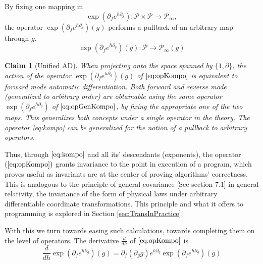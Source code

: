 \documentclass[smallcondensed]{svjour3}
\newcommand{\dP}{\mathcal{P}}
\newcommand{\D}{\partial}
\newtheorem{trditev}{Claim}[section]
\begin{document}
 By fixing one mapping in  
 \begin{equation}\label{eq:opGenKompo}
\exp(\D_fe^{h\D_g}): \dP\times\dP\to\dP_\infty,
 \end{equation}
 the operator $\exp(\D_fe^{h\D_g})(g)$ performs a pullback of an arbitrary map through $g$. 
  \begin{equation}\label{eq:opKompo}
  \exp(\D_fe^{h\D_g})(g): \dP\to\dP_\infty(g)
  \end{equation}
 \begin{trditev}[Unified AD]\label{trd:reverseForward}
 When projecting onto the space spanned by $\{1,\D\}$, the action of the operator $\exp(\D_fe^{h\D_g})(g)$ of $\eqref{eq:opKompo}$ is equivalent to forward \cite{PcAD} mode automatic differentiation. Both forward \cite{PcAD} and reverse \cite{ReverseAD} mode (generalized to arbitrary order) are obtainable using the same operator $\exp(\D_fe^{h\D_g})$ of $\eqref{eq:opGenKompo}$, by fixing the appropriate one of the two maps. This generalizes both concepts under a single operator in the theory. The operator \eqref{eq:kompo} can be generalized for the notion of a pullback to arbitrary operators.
 \end{trditev}
 
 Thus, through $\eqref{eq:kompo}$ and all its' descendants (exponents), the operator $(\ref{eq:opKompo})$ grants invariance to the point in execution of a program, which proves useful as invariants are at the center of proving algorithms' correctness. This is analogous to the principle of general covariance \cite{GeneralCovariance}[See section 7.1] in general relativity, the invariance of the form of physical laws under arbitrary differentiable coordinate transformations. This principle and what it offers to programming is explored in Section \ref{sec:TransInPractice}.
 
 With this we turn towards easing such calculations, towards completing them on the level of operators. The derivative $\frac{d}{dh}$ of $\eqref{eq:opKompo}$ is
 \begin{equation}\label{eq:dexp}
 \frac{d}{dh}\exp(\D_fe^{h\D_g})(g)=\D_f(\D_gg)e^{h\D_g}\exp(\D_fe^{h\D_g})(g)
 \end{equation}
 
\end{document}
